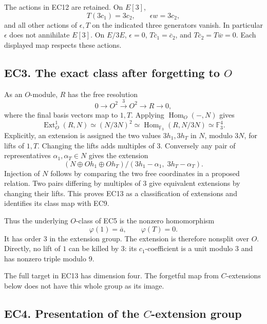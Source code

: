 \documentclass[
  10pt,
]{article}
\begin{document}
The actions in EC12 are retained. On \(E[3]\), \[
T(3c_1)=3c_2,\qquad\epsilon w=3c_2,
\] and all other actions of \(\epsilon,T\) on the indicated three
generators vanish. In particular \(\epsilon\) does not annihilate
\(E[3]\). On \(E/3E\), \(\epsilon=0\), \(T\overline c_1=\overline c_2\),
and \(T\overline c_2=T\overline w=0\). Each displayed map respects these
actions.

\subsection{\texorpdfstring{EC3. The exact class after forgetting to
\(O\)}{EC3. The exact class after forgetting to O}}\label{ec3.-the-exact-class-after-forgetting-to-o}

As an \(O\)-module, \(R\) has the free resolution \[
0\longrightarrow O^2\xrightarrow{3}O^2\longrightarrow R
\longrightarrow0,
\] where the final basis vectors map to \(1,T\). Applying
\(\operatorname{Hom}_O(-,N)\) gives \[
\operatorname{Ext}^1_O(R,N)
\simeq(N/3N)^2
\simeq\operatorname{Hom}_{\mathbb F_3}(R,N/3N)
\simeq\mathbb F_3^4.
\tag{EC13}
\] Explicitly, an extension is assigned the two values \(3h_1,3h_T\) in
\(N\), modulo \(3N\), for lifts of \(1,T\). Changing the lifts adds
multiples of 3. Conversely any pair of representatives
\(\alpha_1,\alpha_T\in N\) gives the extension \[
(N\oplus O h_1\oplus O h_T)/
(3h_1-\alpha_1,\;3h_T-\alpha_T).
\] Injection of \(N\) follows by comparing the two free coordinates in a
proposed relation. Two pairs differing by multiples of 3 give equivalent
extensions by changing their lifts. This proves EC13 as a classification
of extensions and identifies its class map with EC9.

Thus the underlying \(O\)-class of EC5 is the nonzero homomorphism \[
\varphi(1)=\overline a,\qquad\varphi(T)=0.
\tag{EC14}
\] It has order 3 in the extension group. The extension is therefore
nonsplit over \(O\). Directly, no lift of \(1\) can be killed by 3: its
\(c_1\)-coefficient is a unit modulo 3 and has nonzero triple modulo 9.

The full target in EC13 has dimension four. The forgetful map from
\(C\)-extensions below does not have this whole group as its image.

\subsection{\texorpdfstring{EC4. Presentation of the \(C\)-extension
group}{EC4. Presentation of the C-extension group}}\label{ec4.-presentation-of-the-c-extension-group}
\end{document}
